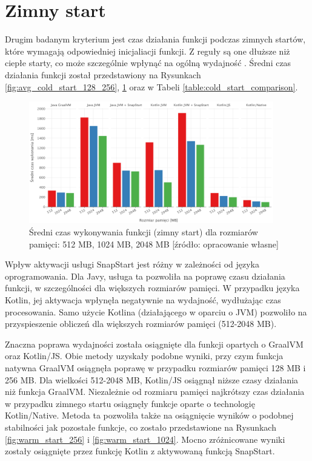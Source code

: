 \newpage
\section{Zimny start}\label{chapter:results_cold_start}

Drugim badanym kryterium jest czas działania funkcji podczas zimnych startów, które wymagają odpowiedniej inicjaliacji funkcji.
Z reguły są one dłuższe niż ciepłe starty, co może szczególnie wpłynąć na ogólną wydajność \cite{9284261}\cite{8605777}.
Średni czas działania funkcji został przedstawiony na Rysunkach \ref{fig:avg_cold_start_128_256}, \ref{fig:avg_cold_start_512_2045} oraz w Tabeli \ref{table:cold_start_comparison}.

\begin{figure}[!h]
    \centering
    \includegraphics[width=0.95\textwidth]{charts/results/avg-cold-start-512-2048.png}
    \caption{Średni czas wykonywania funkcji (zimny start) dla rozmiarów pamięci: 512 MB, 1024 MB, 2048 MB  [źródło: opracowanie własne]}
    \label{fig:avg_cold_start_512_2045}
\end{figure}

Wpływ aktywacji usługi SnapStart jest różny w zależności od języka oprogramowania.
Dla Javy, usługa ta pozwoliła na poprawę czasu działania funkcji, w szczególności dla większych rozmiarów pamięci.
W przypadku języka Kotlin, jej aktywacja wpłynęła negatywnie na wydajność, wydłużając czas procesowania.
Samo użycie Kotlina (działającego w oparciu o JVM) pozwoliło na przyspieszenie obliczeń dla większych rozmiarów pamięci (512-2048 MB).

Znaczna poprawa wydajności została osiągnięte dla funkcji opartych o GraalVM oraz Kotlin/JS.
Obie metody uzyskały podobne wyniki, przy czym funkcja natywna GraalVM osiągnęła poprawę w przypadku rozmiarów pamięci 128 MB i 256 MB.
Dla wielkości 512-2048 MB, Kotlin/JS osiągnął niższe czasy działania niż funkcja GraalVM.
Niezależnie od rozmiaru pamięci najkrótszy czas działania w przypadku zimnego startu osiągnęły funkcje oparte o technologię Kotlin/Native.
Metoda ta pozwoliła także na osiągnięcie wyników o podobnej stabilności jak pozostałe funkcje, co zostało przedstawione na Rysunkach \ref{fig:warm_start_256} i \ref{fig:warm_start_1024}.
Mocno zróżnicowane wyniki zostały osiągnięte przez funkcję Kotlin z aktywowaną funkcją SnapStart.

